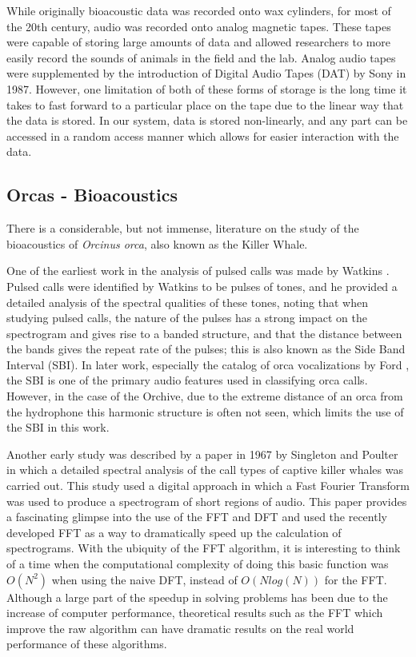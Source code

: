 \documentclass[12pt,oneside]{book}
\begin{document}
While originally bioacoustic data was recorded onto wax cylinders, for
most of the 20th century, audio was recorded onto analog magnetic
tapes.  These tapes were capable of storing large amounts of data and
allowed researchers to more easily record the sounds of animals in the
field and the lab.  Analog audio tapes were supplemented by the
introduction of Digital Audio Tapes (DAT) by Sony in 1987.  However,
one limitation of both of these forms of storage is the long time it
takes to fast forward to a particular place on the tape due to the
linear way that the data is stored.  In our system, data is stored
non-linearly, and any part can be accessed in a random access manner
which allows for easier interaction with the data.

\subsection{Orcas - Bioacoustics}
\label{sec:relatedWork:orcasBioacoustics}

There is a considerable, but not immense, literature on the study of
the bioacoustics of \textit{Orcinus orca}, also known as the Killer
Whale.  

One of the earliest work in the analysis of pulsed calls was made by
Watkins \cite{watkins1967harmonic}. Pulsed calls were identified by
Watkins to be pulses of tones, and he provided a detailed analysis of
the spectral qualities of these tones, noting that when studying
pulsed calls, the nature of the pulses has a strong impact on the
spectrogram and gives rise to a banded structure, and that the
distance between the bands gives the repeat rate of the pulses; this
is also known as the Side Band Interval (SBI).  In later work,
especially the catalog of orca vocalizations by Ford
\cite{ford1987catalogue}, the SBI is one of the primary audio features
used in classifying orca calls.  However, in the case of the Orchive,
due to the extreme distance of an orca from the hydrophone this
harmonic structure is often not seen, which limits the use of the SBI
in this work.

Another early study was described by a paper in 1967 by Singleton and
Poulter \cite{singleton1967spectral} in which a detailed spectral
analysis of the call types of captive killer whales was carried out.
This study used a digital approach in which a Fast Fourier Transform
was used to produce a spectrogram of short regions of audio.  This
paper provides a fascinating glimpse into the use of the FFT and DFT
and used the recently developed FFT \cite{cooley1965algorithm} as a
way to dramatically speed up the calculation of spectrograms.  With
the ubiquity of the FFT algorithm, it is interesting to think of a
time when the computational complexity of doing this basic function
was $O(N^2)$ when using the naive DFT, instead of $O(N log(N))$ for
the FFT.  Although a large part of the speedup in solving problems has
been due to the increase of computer performance, theoretical results
such as the FFT which improve the raw algorithm can have dramatic
results on the real world performance of these algorithms.
\end{document}
